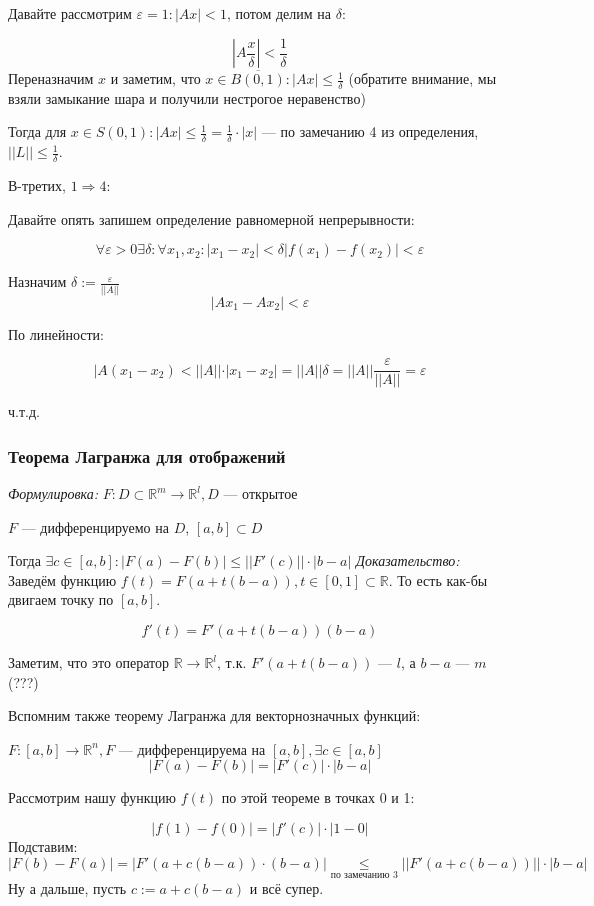 \documentclass{article}
\begin{document}
Давайте рассмотрим $\varepsilon = 1: |Ax| < 1$, потом делим на $\delta$:

\[|A\frac{x}{\delta}| < \frac{1}{\delta}\]
Переназначим $x$ и заметим, что $x \in \overline{B(0, 1)}: |Ax| \le \frac{1}{\delta}$ (обратите внимание, мы взяли замыкание шара и получили нестрогое неравенство)

Тогда для $x \in S(0, 1): |Ax| \le \frac{1}{\delta} = \frac{1}{\delta} \cdot |x|$ --- по замечанию 4 из определения, $||L|| \le \frac{1}{\delta}$.

В-третих, $1 \Rightarrow 4$:

Давайте опять запишем определение равномерной непрерывности:

\[\forall \varepsilon > 0 \exists \delta: \forall x_1, x_2: |x_1 - x_2| < \delta |f(x_1) - f(x_2)| < \varepsilon\]

Назначим $\delta := \frac{\varepsilon}{||A||}$
\[|Ax_1 - Ax_2| < \varepsilon\]

По линейности:

\[|A(x_1 - x_2) < ||A|| \cdot |x_1 - x_2| = ||A|| \delta = ||A|| \frac{\varepsilon}{||A||} = \varepsilon\]

ч.т.д.

\subsubsection{Теорема Лагранжа для отображений}
\textit{Формулировка:}
$F: D \subset \mathbb{R}^m \rightarrow \mathbb{R}^l, D$ --- открытое

$F$ --- дифференцируемо на $D$, $[a, b] \subset D$

Тогда $\exists c \in [a, b]: |F(a) - F(b)| \le ||F'(c)|| \cdot |b - a|$
\textit{Доказательство:}
Заведём функцию $f(t) = F(a + t(b - a)), t \in [0, 1] \subset \mathbb{R}$. То есть как-бы двигаем точку по $[a, b]$.

\[f'(t) = F'(a + t(b - a))(b - a)\]

Заметим, что это оператор $\mathbb{R} \rightarrow \mathbb{R}^l$, т.к. $F'(a + t(b - a))$ --- $l$, а $b - a$ --- $m$ (???)

Вспомним также теорему Лагранжа для векторнозначных функций:

$F: [a, b] \rightarrow \mathbb{R}^n, F$ --- дифференцируема на $[a, b], \exists c \in [a, b]$
\[|F(a) - F(b)| = |F'(c)| \cdot |b - a|\]

Рассмотрим нашу функцию $f(t)$ по этой теореме в точках 0 и 1:

\[|f(1) - f(0)| = |f'(c)| \cdot |1 - 0|\]
Подставим:
\[|F(b) - F(a)| = |F'(a + c(b - a))\cdot(b - a)| \underset{\text{по замечанию 3}}{\le} ||F'(a + c(b - a))|| \cdot |b - a|\]
Ну а дальше, пусть $c := a + c(b - a)$ и всё супер.
\end{document}

